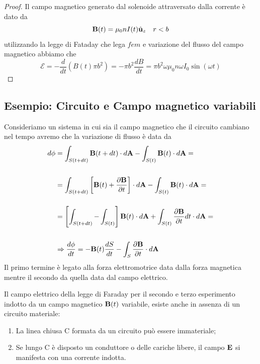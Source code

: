 \begin{proof}
	Il campo magnetico generato dal solenoide attraversato dalla corrente \`e dato da 
	\begin{equation*}
		\bold{B}(t) = \mu_0 nI(t) \hat{\bold{u}}_z \quad r<b
	\end{equation*}
utilizzando la legge di Fataday che lega $fem$ e variazione del flusso del campo magnetico abbiamo che 
\begin{equation*}
	\mathcal{E} = - \frac{d}{dt}(B(t) \pi b^2) = -\pi b^2 \frac{dB}{dt} = \pi b^2 \omega \mu_0 n \omega I_0 \sin(\omega t)
\end{equation*}
\end{proof}

\subsection{Esempio: Circuito e Campo magnetico variabili}

Consideriamo un sistema in cui sia il campo magnetico che il circuito cambiano nel tempo avremo che la variazione di flusso \`e data da
\begin{align*}
	d \phi & = \int_{S(t + dt)} \bold{B}(t + dt) \cdot d \bold{A} - \int_{S(t)} \bold{B}(t) \cdot d\bold{A} = \\ \rule{0pt}{30pt}
	& =\int_{S(t+dt)}\left[ \bold{B}(t) + \frac{\partial \bold{B}}{\partial t}\right] \cdot d \bold{A} - \int_{S(t)} \bold{B}(t) \cdot d\bold{A} = \\ \rule{0pt}{30pt}
	& = \left[\int_{S(t+dt)} - \int_{S(t)}\right] \bold{B}(t) \cdot d\bold{A} +\int_{S(t)} \frac{\partial \bold{B}}{\partial t} dt \cdot d\bold{A} = \\ \rule{0pt}{30pt}
	& \Rightarrow \frac{d \phi }{dt } = - \bold{B}(t) \frac{dS}{dt} - \int_{S} \frac{\partial \bold{B}}{\partial t} \cdot d \bold{A} 
\end{align*}
Il primo termine \`e legato alla forza elettromotrice data dalla forza magnetica mentre il secondo da quella data dal campo elettrico. 

Il campo elettrico della legge di Faraday per il secondo e terzo esperimento indotto da un campo magnetico $\bold{B}(t)$ variabile, esiste anche in assenza di un circuito materiale:
\begin{enumerate}
	\item La linea chiusa C formata da un circuito pu\`o essere immateriale;
	\item Se lungo C \`e disposto un conduttore o delle cariche libere, il campo $\bold{E}$ si manifesta con una corrente indotta.
\end{enumerate}


